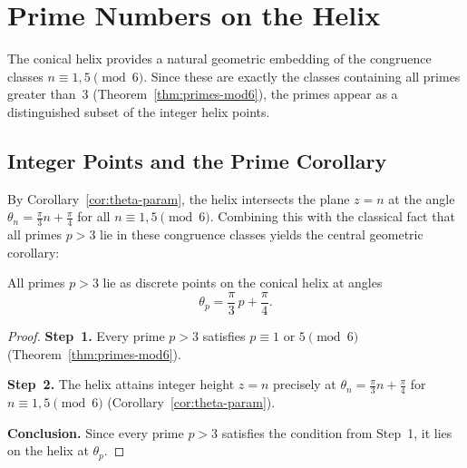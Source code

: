 \section{Prime Numbers on the Helix}\label{sec:primes}

The conical helix provides a natural geometric embedding of the
congruence classes $n \equiv 1, 5 \pmod{6}$. Since these are exactly the
classes containing all primes greater than~$3$
(Theorem~\ref{thm:primes-mod6}), the primes appear as a distinguished
subset of the integer helix points.

\subsection{Integer Points and the Prime Corollary}

By Corollary~\ref{cor:theta-param}, the helix intersects the plane
$z = n$ at the angle $\theta_n = \frac{\pi}{3}n + \frac{\pi}{4}$
for all $n \equiv 1, 5 \pmod{6}$. Combining this with the classical
fact that all primes $p > 3$ lie in these congruence classes yields
the central geometric corollary:

\begin{theorem}\label{thm:primes-helix}
All primes $p > 3$ lie as discrete points on the conical helix at angles
\begin{equation}\label{eq:prime-angle}
  \boxed{\theta_p = \frac{\pi}{3}\,p + \frac{\pi}{4}.}
\end{equation}
\end{theorem}

\begin{proof}
\textbf{Step~1.} Every prime $p > 3$ satisfies
$p \equiv 1$ or $5 \pmod{6}$ (Theorem~\ref{thm:primes-mod6}).

\textbf{Step~2.} The helix attains integer height $z = n$ precisely at
$\theta_n = \frac{\pi}{3}n + \frac{\pi}{4}$ for
$n \equiv 1, 5 \pmod{6}$ (Corollary~\ref{cor:theta-param}).

\textbf{Conclusion.} Since every prime $p > 3$ satisfies the condition
from Step~1, it lies on the helix at $\theta_p$.
\end{proof}

